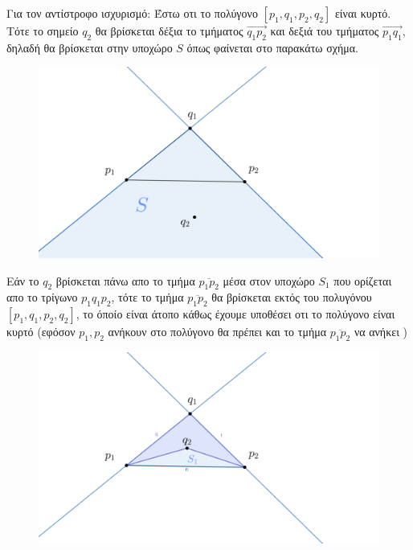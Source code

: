 \documentclass[12pt]{article}
\begin{document}
Για τον αντίστροφο ισχυρισμό: Έστω οτι το πολύγονο $[p_1,q_1,p_2,q_2]$ είναι κυρτό.
Tότε το σημείο $q_2$ θα βρίσκεται δέξια το τμήματος $\overrightarrow{q_1p_2}$  και δεξιά του τμήματος $\overrightarrow{p_1q_1}$, δηλαδή θα βρίσκεται στην υποχώρο $S$ όπως φαίνεται στο παρακάτω σχήμα.
\begin{figure}[H]

    \centering
    \includegraphics[scale = 0.6]{ge2.png}\\ 
\end{figure}
 Εάν το $q_2$  βρίσκεται πάνω απο το τμήμα  $\overline{p_1p_2}$  μέσα στον υποχώρο $S_1$ που ορίζεται απο το τρίγωνο $p_1q_1p_2$, τότε το τμήμα  $\overline{p_1p_2}$ θα βρίσκεται εκτός του πολυγόνου  $[p_1,q_1,p_2,q_2]$, το όποίο είναι άτοπο κάθως έχουμε υποθέσει οτι το πολύγονο είναι κυρτό (εφόσον $p_1,p_2$ ανήκουν στο πολύγονο θα πρέπει και το τμήμα $\overline{p_1p_2}$ να ανήκει  )
 \begin{figure}[H]

    \centering
    \includegraphics[scale = 0.6]{ge3.png}\\ 
\end{figure} 
\end{document}
